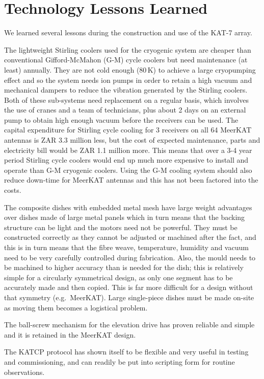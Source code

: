 \section{Technology Lessons Learned}
\label{sec:lessons}

\noindent
We learned several lessons during the construction and use of the
KAT-7 array.

The lightweight Stirling coolers used for the cryogenic system are
cheaper than conventional Gifford-McMahon (G-M) cycle coolers but need
maintenance (at least) annually. They are not cold enough (80\,K) to
achieve a large cryopumping effect and so the system needs ion pumps
in order to retain a high vacuum and mechanical dampers to reduce the
vibration generated by the Stirling coolers. Both of these sub-systems
need replacement on a regular basis, which involves the use of cranes
and a team of technicians, plus about 2 days on an external pump to
obtain high enough vacuum before the receivers can be used.  The
capital expenditure for Stirling cycle cooling for 3 receivers on all
64 MeerKAT antennas is ZAR 3.3 million less, but the cost of expected
maintenance, parts and electricity bill would be ZAR 1.1 million
more. This means that over a 3-4 year period Stirling cycle coolers
would end up much more expensive to install and operate than G-M
cryogenic coolers. Using the G-M cooling system should also reduce
down-time for MeerKAT antennas and this has not been factored into the
costs.

The composite dishes with embedded metal mesh have large weight
advantages over dishes made of large metal panels which in turn means
that the backing structure can be light and the motors need not be
powerful.  They must be constructed correctly as they cannot be
adjusted or machined after the fact, and this is in turn means that
the fibre weave, temperature, humidity and vacuum need to be very
carefully controlled during fabrication.  Also, the mould needs to be
machined to higher accuracy than is needed for the dish; this is
relatively simple for a circularly symmetrical design, as only one
segment has to be accurately made and then copied.  This is far more
difficult for a design without that symmetry (e.g.~MeerKAT).  Large
single-piece dishes must be made on-site as moving them becomes a
logistical problem.


The ball-screw mechanism for the elevation drive has proven reliable
and simple and it is retained in the MeerKAT design.

The KATCP protocol has shown itself to be flexible and very useful in
testing and commissioning, and can readily be put into scripting form
for routine observations.

